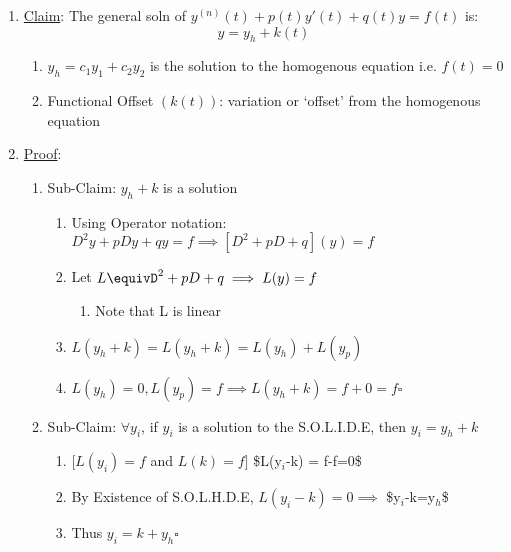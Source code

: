 \documentclass[11pt]{article}
\begin{document}
\begin{enumerate}
\item \underline{Claim}: The general soln of $y^{(n)}(t)+p(t)y'(t)+q(t)y=f(t)$ is:
        \begin{equation}
        y=y_h+k(t)
        \end{equation}

\begin{enumerate}
\item $y_h = c_1y_1+c_2y_2$ is the solution to the homogenous
           equation i.e. $f(t)=0$
\item Functional Offset $(k(t))$: variation or `offset' from the homogenous equation
\end{enumerate}

\item \underline{Proof}:

\begin{enumerate}
\item Sub-Claim: $y_h+k$ is a solution

\begin{enumerate}
\item Using Operator notation: $D^2y+pDy+qy=f \implies [D^2+pD+q](y)=f$
\item Let $L\equivD^2+pD+q \implies L(y)=f$

\begin{enumerate}
\item Note that L is linear
\end{enumerate}

\item $L(y_h+k) = L(y_h+k)=L(y_h)+L(y_p)$
\item $L(y_h)=0,L(y_p)=f \implies L(y_h+k)=f+0 = f \square$
\end{enumerate}

\item Sub-Claim: $\forall y_i$, if $y_i$ is a solution to the
           S.O.L.I.D.E, then $y_i=y_h+k$

\begin{enumerate}
\item $[L(y_i)=f$ and $L(k)=f]$ \$\implies L(y$_i$-k) = f-f=0\$
\item By Existence of S.O.L.H.D.E, $L(y_i-k)=0 \implies$ \$y$_i$-k=y$_h$\$
\item Thus $y_i=k+y_h \square$
\end{enumerate}

\end{enumerate}

\end{enumerate}
\end{document}
